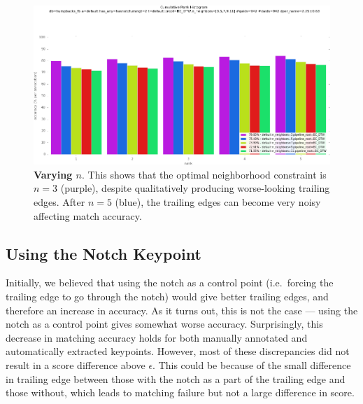 \begin{figure}[t]%
\centering
\includegraphics[width=1\textwidth]{../images/results/vary_neighbors.png}
\caption{\textbf{Varying $n$}. This shows that the optimal neighborhood constraint is $n = 3$ (purple), despite qualitatively producing worse-looking trailing edges. After $n = 5$ (blue), the trailing edges can become very noisy affecting match accuracy.}
\label{fig:vary_neighbors}
\end{figure}

\subsection{Using the Notch Keypoint}

Initially, we believed that using the notch as a control point (i.e.\ forcing the trailing edge to go through the notch) would give better trailing edges, and therefore an increase in accuracy.
As it turns out, this is not the case --- using the notch as a control point gives somewhat worse accuracy.
Surprisingly, this decrease in matching accuracy holds for both manually annotated and automatically extracted keypoints.
However, most of these discrepancies did not result in a score difference above $\epsilon$.
This could be because of the small difference in trailing edge between those with the notch as a part of the trailing edge and those without, which leads to matching failure but not a large difference in score.


